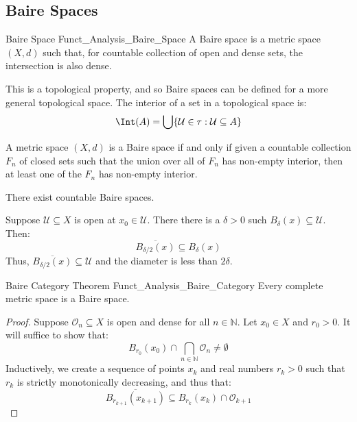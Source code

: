         \subsection{Baire Spaces}
            \begin{ldefinition}{Baire Space}
                  {Funct_Analysis_Baire_Space}
            A Baire space is a metric space $(X,d)$ such that, for
            countable collection of open and dense sets, the
            intersection is also dense.
        \end{ldefinition}
            This is a topological property, and so Baire spaces can
            be defined for a more general topological space. The
            interior of a set in a topological space is:
            \begin{equation}
            \Int(A)=
            \bigcup\{\mathcal{U}\in\tau:\mathcal{U}\subseteq{A}\}
        \end{equation}
            \begin{theorem}
            A metric space $(X,d)$ is a Baire space if and only
            if given a countable collection $F_{n}$ of closed
            sets such that the union over all of $F_{n}$ has
            non-empty interior, then at least one of the $F_{n}$
            has non-empty interior.
            \end{theorem}
            \begin{theorem}
                There exist countable Baire spaces.
            \end{theorem}
            Suppose $\mathcal{U}\subseteq{X}$ is open at
            $x_{0}\in\mathcal{U}$. There there is a $\delta>0$ such
            $B_{\delta}(x)\subseteq\mathcal{U}$. Then:
            \begin{equation}
                \overline{B_{\delta/2}(x)}\subseteq{B}_{\delta}(x)
            \end{equation}
            Thus, $\overline{B_{\delta/2}(x)}\subseteq\mathcal{U}$
            and the diameter is less than $2\delta$.
            \begin{ltheorem}{Baire Category Theorem}
                  {Funct_Analysis_Baire_Category}
                Every complete metric space is a Baire space.
            \end{ltheorem}
            \begin{proof}
            Suppose $\mathcal{O}_{n}\subseteq{X}$ is open and
            dense for all $n\in\mathbb{N}$. Let $x_{0}\in{X}$ and
            $r_{0}>0$. It will suffice to show that:
            \begin{equation}
                B_{r_{0}}(x_{0})\cap\bigcap_{n\in\mathbb{N}}
                    \mathcal{O}_{n}\ne\emptyset
            \end{equation}
            Inductively, we create a sequence of points $x_{k}$
            and real numbers $r_{k}>0$ such that $r_{k}$ is strictly
            monotonically decreasing, and thus that:
            \begin{equation}
                \overline{B_{r_{k+1}}(x_{k+1})}
                \subseteq{B}_{r_{k}}(x_{k})\cap\mathcal{O}_{k+1}
            \end{equation}
        \end{proof}
